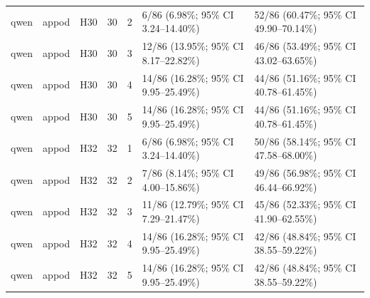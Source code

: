 \begin{longtable}{lllrrll}
qwen & appod & H30 & 30 & 2 & 6/86 (6.98\%; 95\% CI 3.24–14.40\%) & 52/86 (60.47\%; 95\% CI 49.90–70.14\%) \\
qwen & appod & H30 & 30 & 3 & 12/86 (13.95\%; 95\% CI 8.17–22.82\%) & 46/86 (53.49\%; 95\% CI 43.02–63.65\%) \\
qwen & appod & H30 & 30 & 4 & 14/86 (16.28\%; 95\% CI 9.95–25.49\%) & 44/86 (51.16\%; 95\% CI 40.78–61.45\%) \\
qwen & appod & H30 & 30 & 5 & 14/86 (16.28\%; 95\% CI 9.95–25.49\%) & 44/86 (51.16\%; 95\% CI 40.78–61.45\%) \\
qwen & appod & H32 & 32 & 1 & 6/86 (6.98\%; 95\% CI 3.24–14.40\%) & 50/86 (58.14\%; 95\% CI 47.58–68.00\%) \\
qwen & appod & H32 & 32 & 2 & 7/86 (8.14\%; 95\% CI 4.00–15.86\%) & 49/86 (56.98\%; 95\% CI 46.44–66.92\%) \\
qwen & appod & H32 & 32 & 3 & 11/86 (12.79\%; 95\% CI 7.29–21.47\%) & 45/86 (52.33\%; 95\% CI 41.90–62.55\%) \\
qwen & appod & H32 & 32 & 4 & 14/86 (16.28\%; 95\% CI 9.95–25.49\%) & 42/86 (48.84\%; 95\% CI 38.55–59.22\%) \\
qwen & appod & H32 & 32 & 5 & 14/86 (16.28\%; 95\% CI 9.95–25.49\%) & 42/86 (48.84\%; 95\% CI 38.55–59.22\%) \\
\end{longtable}

